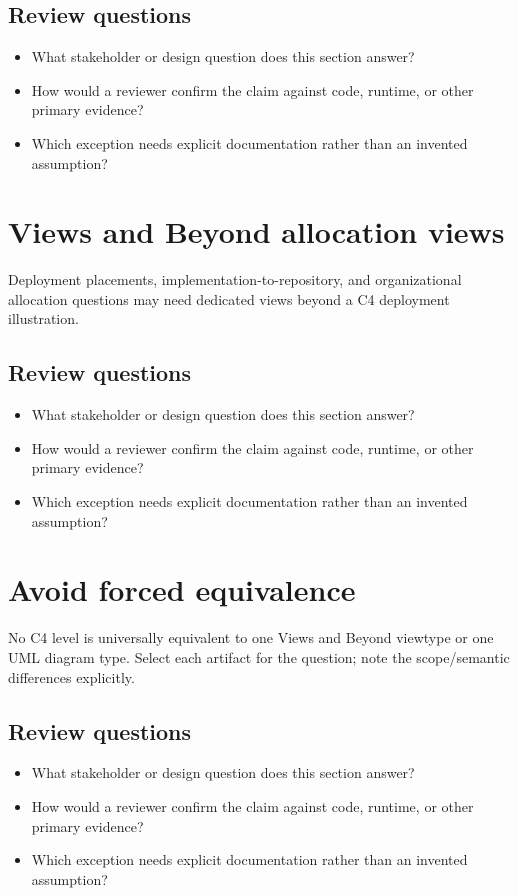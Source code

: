 \documentclass[10pt,letterpaper]{article}
\begin{document}
\subsection{Review questions}
\begin{itemize}
\item What stakeholder or design question does this section answer?
\item How would a reviewer confirm the claim against code, runtime, or other primary evidence?
\item Which exception needs explicit documentation rather than an invented assumption?
\end{itemize}

\section{Views and Beyond allocation views}
Deployment placements, implementation-to-repository, and organizational allocation questions may need dedicated views beyond a C4 deployment illustration.


\subsection{Review questions}
\begin{itemize}
\item What stakeholder or design question does this section answer?
\item How would a reviewer confirm the claim against code, runtime, or other primary evidence?
\item Which exception needs explicit documentation rather than an invented assumption?
\end{itemize}

\section{Avoid forced equivalence}
No C4 level is universally equivalent to one Views and Beyond viewtype or one UML diagram type. Select each artifact for the question; note the scope/semantic differences explicitly.


\subsection{Review questions}
\begin{itemize}
\item What stakeholder or design question does this section answer?
\item How would a reviewer confirm the claim against code, runtime, or other primary evidence?
\item Which exception needs explicit documentation rather than an invented assumption?
\end{itemize}
\end{document}
